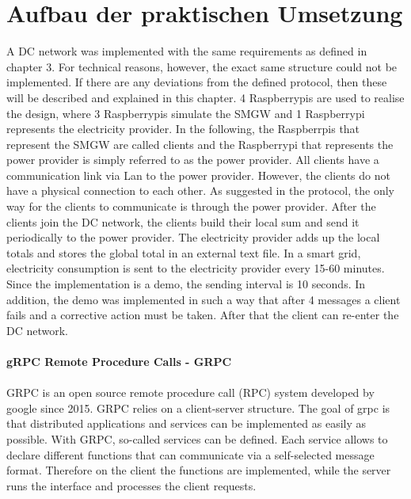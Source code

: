 \section{Aufbau der praktischen Umsetzung}
A DC network was implemented with the same requirements as defined in chapter 3. For technical reasons, however, the exact same structure could not be implemented. If there are any deviations from the defined protocol, then these will be described and explained in this chapter.
4 Raspberrypis are used to realise the design, where 3 Raspberrypis simulate the SMGW and 1 Raspberrypi represents the electricity provider.  In the following, the Raspberrpis that represent the SMGW are called clients and the Raspberrypi that represents the power provider is simply referred to as the power provider. All clients have a communication link via Lan to the power provider. However, the clients do not have a physical connection to each other. As suggested in the protocol, the only way for the clients to communicate is through the power provider. After the clients join the DC network, the clients build their local sum and send it periodically to the power provider. The electricity provider adds up the local totals and stores the global total in an external text file. In a smart grid, electricity consumption is sent to the electricity provider every 15-60 minutes. Since the implementation is a demo, the sending interval is 10 seconds. In addition, the demo was implemented in such a way that after 4 messages a client fails and a corrective action must be taken. After that the client can re-enter the DC network.\\
\\
\textbf{gRPC Remote Procedure Calls - GRPC}
\\
\\
GRPC is an open source remote procedure call (RPC) system developed by google since 2015. GRPC relies on a client-server structure. The goal of grpc is that distributed applications and services can be implemented as easily as possible. With GRPC, so-called services can be defined. Each service allows to declare different functions that can communicate via a self-selected message format. Therefore on the client the functions are implemented, while the server runs the interface and processes the client requests. 

\cleardoublepage

